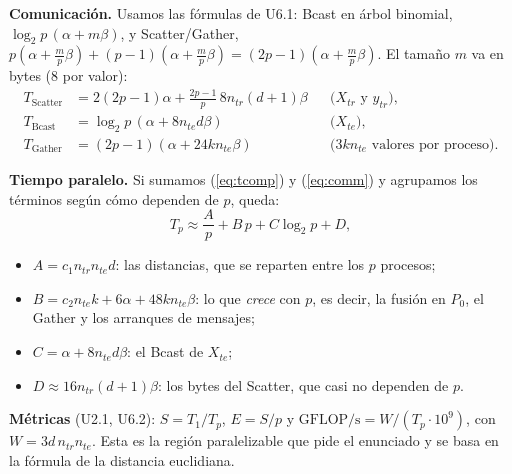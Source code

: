 \documentclass[11pt,a4paper]{article}
\newcommand{\ntr}{n_{tr}}
\newcommand{\nte}{n_{te}}
\newcommand{\tsub}[1]{T_{\mathrm{#1}}}
\begin{document}
\textbf{Comunicación.} Usamos las fórmulas de U6.1: Bcast en árbol binomial, $\log_2p\,(\alpha+m\beta)$, y Scatter/Gather, $p(\alpha+\frac mp\beta)+(p-1)(\alpha+\frac mp\beta)=(2p-1)(\alpha+\frac mp\beta)$. El tamaño $m$ va en bytes (8 por valor):
\begin{align}
\tsub{Scatter}&=2(2p-1)\alpha+\tfrac{2p-1}{p}\,8\ntr(d+1)\beta &&\text{($X_{tr}$ y $y_{tr}$)},\nonumber\\
\tsub{Bcast}&=\log_2p\,(\alpha+8\nte d\beta) &&\text{($X_{te}$)},\label{eq:comm}\\
\tsub{Gather}&=(2p-1)(\alpha+24k\nte\beta) &&\text{($3k\nte$ valores por proceso)}.\nonumber
\end{align}

\textbf{Tiempo paralelo.} Si sumamos (\ref{eq:tcomp}) y (\ref{eq:comm}) y agrupamos los términos según cómo dependen de $p$, queda:
\begin{equation}
T_p\approx\frac{A}{p}+B\,p+C\log_2p+D,\label{eq:tp}
\end{equation}
\begin{itemize}\setlength{\itemsep}{1pt}
\item $A=c_1\ntr\nte d$: las distancias, que se reparten entre los $p$ procesos;
\item $B=c_2\nte k+6\alpha+48k\nte\beta$: lo que \emph{crece} con $p$, es decir, la fusión en $P_0$, el Gather y los arranques de mensajes;
\item $C=\alpha+8\nte d\beta$: el Bcast de $X_{te}$;
\item $D\approx16\ntr(d+1)\beta$: los bytes del Scatter, que casi no dependen de $p$.
\end{itemize}

\textbf{Métricas} (U2.1, U6.2): $S=T_1/T_p$, $E=S/p$ y $\text{GFLOP/s}=W/(T_p\cdot10^9)$, con $W=3d\,\ntr\nte$. Esta es la región paralelizable que pide el enunciado y se basa en la fórmula de la distancia euclidiana.
\end{document}
